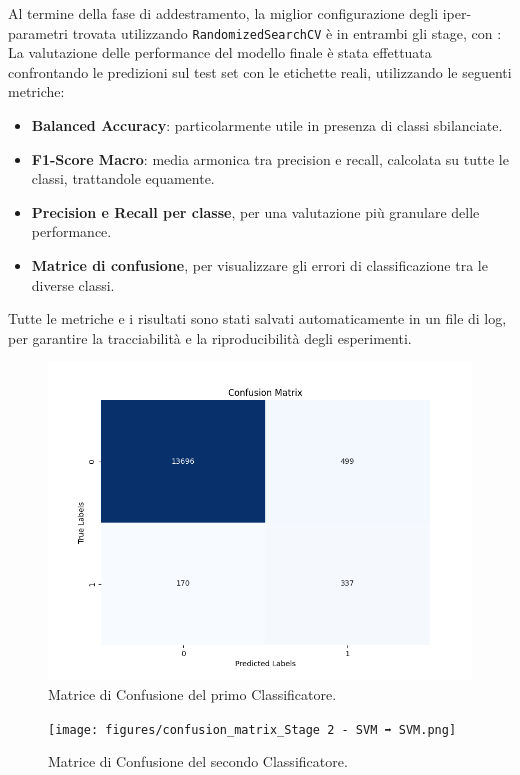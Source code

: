\documentclass[minted, draw]{../tex/hebdomon}
\newif\ifshowcode
\begin{document}

Al termine della fase di addestramento, la miglior configurazione degli iper-parametri trovata utilizzando \texttt{RandomizedSearchCV} è  in entrambi gli stage, con :\\
\ifshowcode
%
\begin{code}{python}
  param_dist = {
        'selector__k': [700],
        'classifier__C': [100],
        'classifier__kernel': ['poly'],
        'classifier__gamma': ['auto'] 
    }
\end{code}
%
\fi
La valutazione delle performance del modello finale è stata effettuata confrontando le predizioni sul test set con le etichette reali, utilizzando le seguenti metriche:

\begin{itemize}
\item \textbf{Balanced Accuracy}: particolarmente utile in presenza di classi sbilanciate.
\item \textbf{F1-Score Macro}: media armonica tra precision e recall, calcolata su tutte le classi, trattandole equamente.
\item \textbf{Precision e Recall per classe}, per una valutazione più granulare delle performance.
\item \textbf{Matrice di confusione}, per visualizzare gli errori di classificazione tra le diverse classi.
\end{itemize}

Tutte le metriche e i risultati sono stati salvati automaticamente in un file di log, per garantire la tracciabilità e la riproducibilità degli esperimenti.

% 
\begin{figure}[H]
  \centering
  \includegraphics[width=.8\linewidth]{figures/confusion_matrix_Stage 1 - SVM.png}
  \caption{Matrice di Confusione del primo Classificatore.}
  \label{fig:confusion_1}
\end{figure}
% 
\begin{figure}[H]
  \centering
  \texttt{[image: figures/confusion\_matrix\_Stage 2 - SVM ➡ SVM.png]}
  \caption{Matrice di Confusione del secondo Classificatore.}
  \label{fig:confusion_2}
\end{figure}
%
\end{document}
